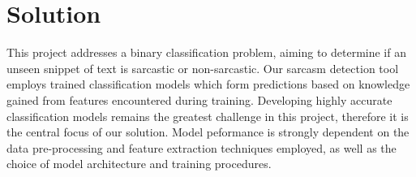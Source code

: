 \documentclass[12pt,a4paper]{article}
\begin{document}







\section{Solution}
\noindent This project addresses a binary classification problem, aiming to determine if an unseen snippet of text is sarcastic or non-sarcastic. Our sarcasm detection tool employs trained classification models which form  predictions based on knowledge gained from features encountered during training. Developing highly accurate classification models remains the greatest challenge in this project, therefore it is the central focus of our solution. Model peformance is strongly dependent on the data pre-processing and feature extraction techniques employed, as well as the choice of model architecture and training procedures. 
\end{document}
